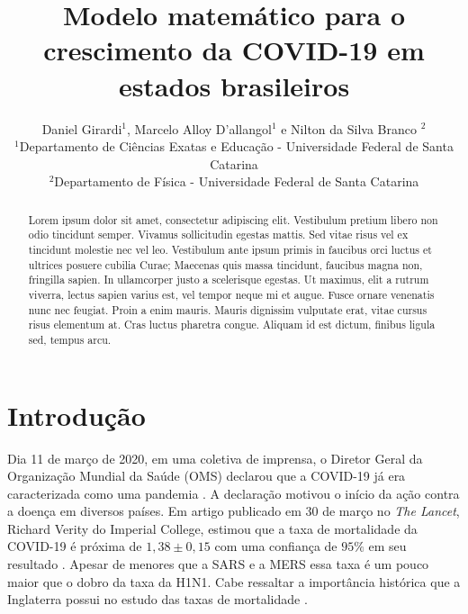 \documentclass[12pt,a4papper]{article}
\title{Modelo matemático para o crescimento da COVID-19 em estados brasileiros}
\author{Daniel Girardi$^{1}$, Marcelo Alloy D'allangol$^{1}$ e Nilton da Silva Branco $^{2}$  \\
        \small $^{1}$Departamento de Ciências Exatas e Educação - Universidade Federal de Santa Catarina \\
        \small $^{2}$Departamento de Física - Universidade Federal de Santa Catarina \\
}
\begin{document}
\maketitle

\begin{abstract}
Lorem ipsum dolor sit amet, consectetur adipiscing elit. Vestibulum pretium libero non odio tincidunt semper. Vivamus sollicitudin egestas mattis. Sed vitae risus vel ex tincidunt molestie nec vel leo. Vestibulum ante ipsum primis in faucibus orci luctus et ultrices posuere cubilia Curae; Maecenas quis massa tincidunt, faucibus magna non, fringilla sapien. In ullamcorper justo a scelerisque egestas. Ut maximus, elit a rutrum viverra, lectus sapien varius est, vel tempor neque mi et augue. Fusce ornare venenatis nunc nec feugiat. Proin a enim mauris. Mauris dignissim vulputate erat, vitae cursus risus elementum at. Cras luctus pharetra congue. Aliquam id est dictum, finibus ligula sed, tempus arcu. 
\end{abstract} \hspace{10pt}

\section{Introdução}


Dia 11 de março de 2020, em uma coletiva de imprensa, o Diretor Geral da Organização Mundial da Saúde (OMS) declarou que a COVID-19 já era caracterizada como uma pandemia \cite{WHOpandemic}. A declaração motivou o início da ação contra a doença em diversos países. Em artigo publicado em 30 de março no \textit{The Lancet}, Richard Verity do Imperial College, estimou que a taxa de mortalidade da COVID-19 é próxima de $1,38\pm 0,15$ com uma confiança de $95\%$ em seu resultado \cite{verity2020estimates}. Apesar de  menores que a SARS \cite{wang2004simulating} e a MERS \cite{majumder2014estimation} essa taxa é um pouco maior que o dobro da taxa da H1N1. Cabe ressaltar a importância histórica que a Inglaterra possui no estudo das taxas de mortalidade \cite{robertson1996reckoning}. 
\end{document}
